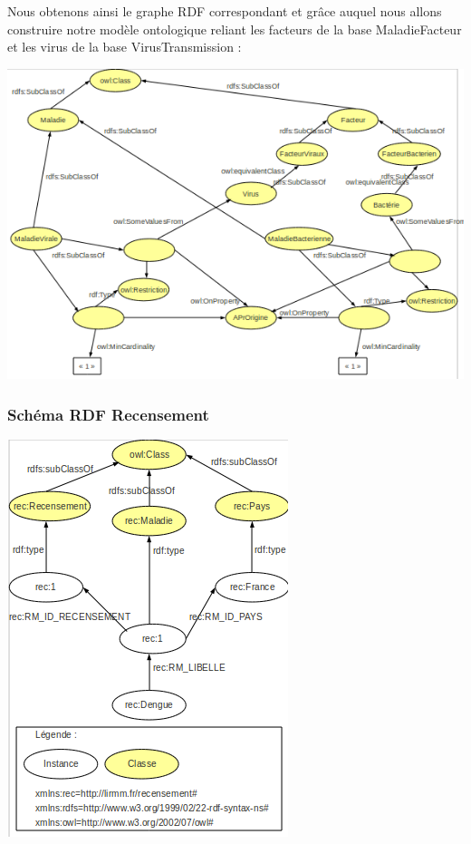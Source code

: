 \documentclass[12pt]{article}
\begin{document}
\newpage
\indent Nous obtenons ainsi le graphe RDF correspondant et grâce auquel nous allons construire notre modèle ontologique reliant les facteurs de la base MaladieFacteur et les virus de la base VirusTransmission :

\begin{center}
	\includegraphics[scale=0.70]{images/rdf-schema.png}
\end{center}

\subsubsection{Schéma RDF Recensement}

\begin{center}
	\includegraphics[scale=0.70]{images/rdf-recensement.png}
\end{center}
\end{document}
